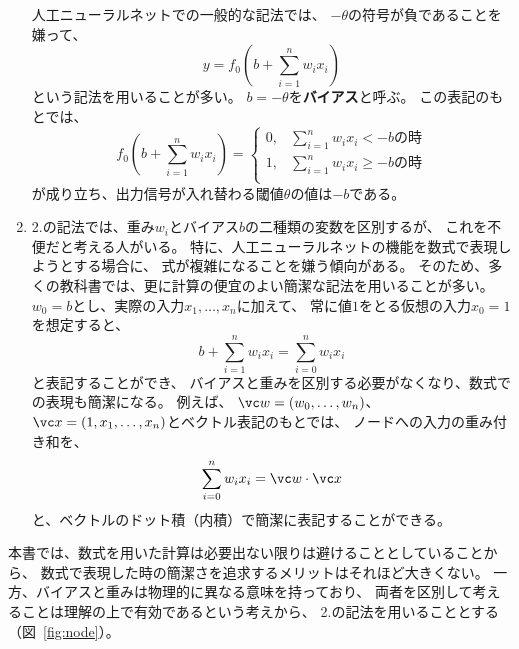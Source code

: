 \begin{enumerate}
  人工ニューラルネットでの一般的な記法では、
  $-\theta$の符号が負であることを嫌って、
  \begin{equation}
    y = f_0\left(b + \sum_{i=1}^n w_i x_i\right)
    \label{eq:1}
  \end{equation}
  という記法を用いることが多い。
  $b = -\theta$を\textbf{バイアス}と呼ぶ。
  この表記のもとでは、
  \[
    f_0\left(b + \sum_{i=1}^n w_i x_i\right) =
    \begin{cases}
      0, & \text{$\displaystyle\sum_{i=1}^n w_i x_i < -b$の時}\\
      1, & \text{$\displaystyle\sum_{i=1}^n w_i x_i \ge -b$の時}\\
    \end{cases}
  \]
  が成り立ち、出力信号が入れ替わる閾値$\theta$の値は$-b$である。
\item
  2.の記法では、重み$w_i$とバイアス$b$の二種類の変数を区別するが、
  これを不便だと考える人がいる。
  特に、人工ニューラルネットの機能を数式で表現しようとする場合に、
  式が複雑になることを嫌う傾向がある。
  そのため、多くの教科書では、更に計算の便宜のよい簡潔な記法を用いることが多い。
  $w_0 = b$とし、実際の入力$x_1, \dots, x_n$に加えて、
  常に値$1$をとる仮想の入力$x_0 = 1$を想定すると、
  \[
    b + \sum_{i=1}^n w_i x_i = \sum_{i=0}^n w_i x_i
  \]
  と表記することができ、
  バイアスと重みを区別する必要がなくなり、数式での表現も簡潔になる。
  例えば、
  $\vc w = (w_0, \dots, w_n)$、
  $\vc x = (1, x_1, \dots, x_n)$とベクトル表記のもとでは、
  ノードへの入力の重み付き和を、
  \[
    \sum_{i=0}^n w_i x_i = \vc w\cdot\vc x
  \]
  と、ベクトルのドット積（内積）で簡潔に表記することができる。
\end{enumerate}

本書では、数式を用いた計算は必要出ない限りは避けることとしていることから、
数式で表現した時の簡潔さを追求するメリットはそれほど大きくない。
一方、バイアスと重みは物理的に異なる意味を持っており、
両者を区別して考えることは理解の上で有効であるという考えから、
2.の記法を用いることとする（図~\ref{fig:node}）。

